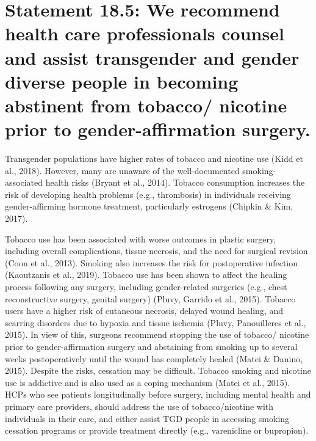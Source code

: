\documentclass[
]{book}
\begin{document}
\hypertarget{statement-18.5-we-recommend-health-care-professionals-counsel-and-assist-transgender-and-gender-diverse-people-in-becoming-abstinent-from-tobacco-nicotine-prior-to-gender-affirmation-surgery.}{%
\section*{Statement 18.5: We recommend health care professionals counsel and assist transgender and gender diverse people in becoming abstinent from tobacco/ nicotine prior to gender-affirmation surgery.}\label{statement-18.5-we-recommend-health-care-professionals-counsel-and-assist-transgender-and-gender-diverse-people-in-becoming-abstinent-from-tobacco-nicotine-prior-to-gender-affirmation-surgery.}}

Transgender populations have higher rates of
tobacco and nicotine use (Kidd et al., 2018).
However, many are unaware of the
well-documented smoking-associated health risks
(Bryant et al., 2014). Tobacco consumption
increases the risk of developing health problems
(e.g., thrombosis) in individuals receiving
gender-affirming hormone treatment, particularly
estrogens (Chipkin \& Kim, 2017).

Tobacco use has been associated with worse outcomes in plastic surgery, including overall complications, tissue necrosis, and the need for surgical
revision (Coon et al., 2013). Smoking also increases
the risk for postoperative infection (Kaoutzanis
et al., 2019). Tobacco use has been shown to affect
the healing process following any surgery, including
gender-related surgeries (e.g., chest reconstructive
surgery, genital surgery) (Pluvy, Garrido et al.,
2015). Tobacco users have a higher risk of cutaneous necrosis, delayed wound healing, and scarring disorders due to hypoxia and tissue ischemia
(Pluvy, Panouilleres et al., 2015). In view of this,
surgeons recommend stopping the use of tobacco/
nicotine prior to gender-affirmation surgery and
abstaining from smoking up to several weeks postoperatively until the wound has completely healed
(Matei \& Danino, 2015). Despite the risks, cessation may be difficult. Tobacco smoking and nicotine use is addictive and is also used as a coping
mechanism (Matei et al., 2015). HCPs who see
patients longitudinally before surgery, including
mental health and primary care providers, should
address the use of tobacco/nicotine with individuals
in their care, and either assist TGD people in
accessing smoking cessation programs or provide
treatment directly (e.g., varenicline or bupropion).
\end{document}
